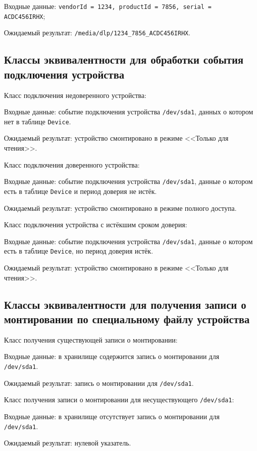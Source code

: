 Входные данные: \texttt{vendorId = 1234, productId = 7856, serial = ACDC456IRHX};

Ожидаемый результат: \texttt{/media/dlp/1234\_7856\_ACDC456IRHX}.

\subsection{Классы эквивалентности для обработки события подключения устройства}

Класс подключения недоверенного устройства:

Входные данные: событие подключения устройства \texttt{/dev/sda1}, данных о котором нет в таблице \texttt{Device}.

Ожидаемый результат: устройство смонтировано в режиме <<Только для чтения>>.

Класс подключения доверенного устройства:

Входные данные: событие подключения устройства \texttt{/dev/sda1}, данные о котором есть в таблице \texttt{Device} и период доверия не истёк.

Ожидаемый результат: устройство смонтировано в режиме полного доступа.

Класс подключения устройства с истёкшим сроком доверия:

Входные данные: событие подключения устройства \texttt{/dev/sda1}, данные о котором есть в таблице \texttt{Device}, но период доверия истёк.

Ожидаемый результат: устройство смонтировано в режиме <<Только для чтения>>.

\subsection{Классы эквивалентности для получения записи о монтировании по специальному файлу устройства}

Класс получения существующей записи о монтировании:

Входные данные: в хранилище содержится запись о монтировании для \texttt{/dev/sda1}.

Ожидаемый результат: запись о монтировании для \texttt{/dev/sda1}.

Класс получения записи о монтировании для несуществующего \texttt{/dev/sda1}:

Входные данные: в хранилище отсутствует запись о монтировании для \texttt{/dev/sda1}.

Ожидаемый результат: нулевой указатель.

